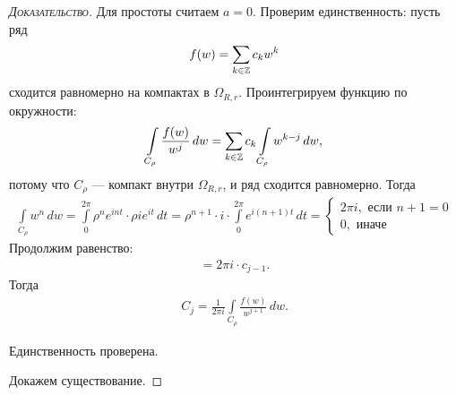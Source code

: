 \documentclass[../../main.tex]{subfiles}
\begin{document}
\begin{proof}[\normalfont\textsc{Доказательство}]
 Для простоты считаем $ a = 0 $. Проверим единственность: пусть ряд
 \begin{align*}
  f(w) = \sum_{k \in \mathbb{Z}}c_k w^{k}
 \end{align*} сходится равномерно на компактах в $ \Omega_{R,r} $. Проинтегрируем функцию по окружности:
 \begin{align*}
  \int\limits_{C_\rho} \frac{f(w)}{w^{j}} \,dw = \sum_{k \in \mathbb{Z}} c_k \int\limits_{C_\rho} w^{k-j}\,dw,
 \end{align*} потому что $ C_\rho $ --- компакт внутри $ \Omega_{R,r} $, и ряд сходится равномерно. Тогда
 \begin{align*}
  \int\limits_{C_\rho} w^{n}  \, dw = \int\limits_{0}^{2\pi}  \rho^{n} e^{int} \cdot \rho i e^{it}\,dt = \rho^{n+1} \cdot i \cdot \int\limits_{0}^{2\pi} e^{i(n+1)t}\,dt = \begin{cases}
   2\pi i, \text{ если } n+1=0 \\
   0, \text{ иначе }
  \end{cases} 
 \end{align*} Продолжим равенство:
 \begin{align*}
  = 2\pi i \cdot c_{j-1}.
 \end{align*} Тогда
 \begin{align*}
  C_j = \frac{1}{2\pi i} \int\limits_{C_\rho}   \frac{f(w)}{w^{j+1}}\,dw.
 \end{align*}

 Единственность проверена.

 Докажем существование.


\end{proof}
\end{document}
